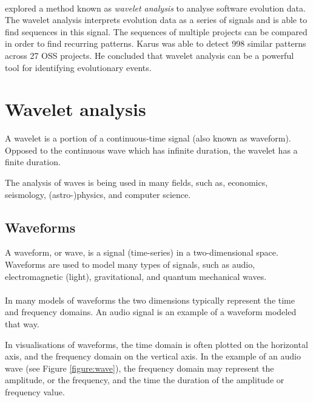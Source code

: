 \paragraph{}
\citet{karus2013} explored a method known as \emph{wavelet analysis }\rm to
analyse software evolution data. The wavelet analysis interprets evolution data
as a series of signals and is able to find sequences in this signal. The
sequences of multiple projects can be compared in order to find recurring
patterns. Karus was able to detect 998 similar patterns across 27 OSS projects.
He concluded that wavelet analysis can be a powerful tool for identifying
evolutionary events.





\section{Wavelet analysis}
\label{wavelet_analysis}
A wavelet is a portion of a continuous-time signal (also known as waveform).
Opposed to the continuous wave which has infinite duration, the wavelet has a
finite duration.

The analysis of waves is being used in many fields, such as, economics,
seismology, (astro-)physics, and computer science.

\subsection{Waveforms}
A waveform, or wave, is a signal (time-series) in a two-dimensional space.
Waveforms are used to model many types of signals, such as audio,
electromagnetic (light), gravitational, and quantum mechanical waves.

\paragraph{}
In many models of waveforms the two dimensions typically represent the time and
frequency domains. An audio signal is an example of a waveform modeled that way.

In visualisations of waveforms, the time domain is often plotted on the
horizontal axis, and the frequency domain on the vertical axis. In the example
of an audio wave (see Figure \ref{figure:wave}), the frequency domain may
represent the amplitude, or the frequency, and the time the duration of the
amplitude or frequency value.

